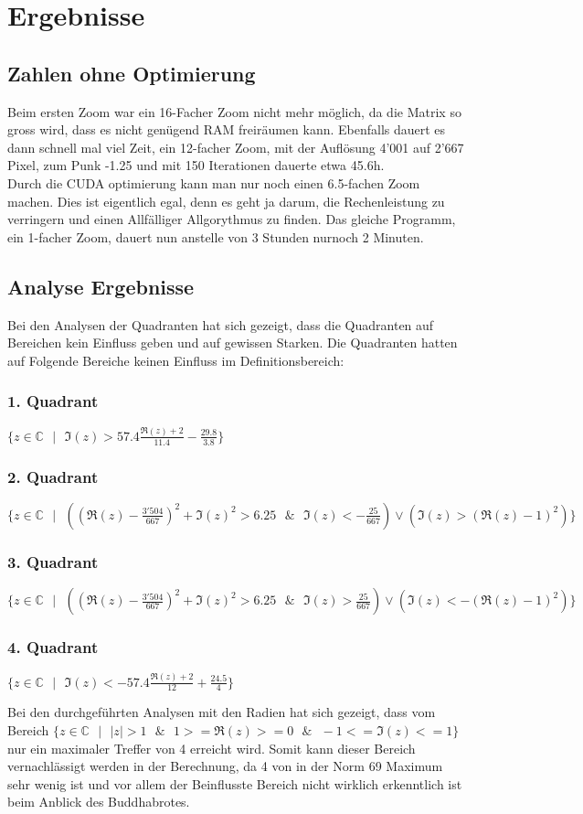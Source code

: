 \section{Ergebnisse}

\subsection{Zahlen ohne Optimierung}
Beim ersten Zoom war ein 16-Facher Zoom nicht mehr möglich, da die Matrix so gross wird, dass es nicht genügend RAM freiräumen kann. Ebenfalls dauert es dann schnell mal viel Zeit, ein 12-facher Zoom, mit der Auflösung 4'001 auf 2'667 Pixel, zum Punk -1.25 und mit 150 Iterationen dauerte etwa 45.6h.\\
Durch die CUDA optimierung kann man nur noch einen 6.5-fachen Zoom machen. Dies ist eigentlich egal, denn es geht ja darum, die Rechenleistung zu verringern und einen Allfälliger Allgorythmus zu finden. Das gleiche Programm, ein 1-facher Zoom, dauert nun anstelle von 3 Stunden nurnoch 2 Minuten.

\subsection{Analyse Ergebnisse}
Bei den Analysen der Quadranten hat sich gezeigt, dass die Quadranten auf Bereichen kein Einfluss geben und auf gewissen Starken. Die Quadranten hatten auf Folgende Bereiche keinen Einfluss im Definitionsbereich:
\begin{center}
\subsubsection*{1. Quadrant}
$\{z \in \mathbb{C}\text{ }|\text{ }\Im(z)>57.4\frac{\Re(z)+2}{11.4}-\frac{29.8}{3.8}\}$
\subsubsection*{2. Quadrant}
$\{z \in \mathbb{C}\text{ }|\text{ }((\Re(z)-\frac{3'504}{667})^2+\Im(z)^2>6.25 \text{ }\&\text{ } \Im(z) < -\frac{25}{667}) \lor (\Im(z)>(\Re(z)-1)^2) \}$
\subsubsection*{3. Quadrant}
$\{z \in \mathbb{C}\text{ }|\text{ }((\Re(z)-\frac{3'504}{667})^2+\Im(z)^2>6.25 \text{ }\&\text{ } \Im(z) > \frac{25}{667}) \lor (\Im(z)<-(\Re(z)-1)^2) \}$
\subsubsection*{4. Quadrant}
$\{z \in \mathbb{C}\text{ }|\text{ }\Im(z)<-57.4\frac{\Re(z)+2}{12}+\frac{24.5}{4}\}$\\
\end{center}
Bei den durchgeführten Analysen mit den Radien hat sich gezeigt, dass vom Bereich $\{z \in \mathbb{C}\text{ }|\text{ } |z| >1\text{ } \& \text{ } 1>=\Re(z)>=0 \text{ } \& \text{ }-1<=\Im(z)<=1\}$ nur ein maximaler Treffer von 4 erreicht wird. Somit kann dieser Bereich vernachlässigt werden in der Berechnung, da 4 von in der Norm 69 Maximum sehr wenig ist und vor allem der Beinflusste Bereich nicht wirklich erkenntlich ist beim Anblick des Buddhabrotes.


